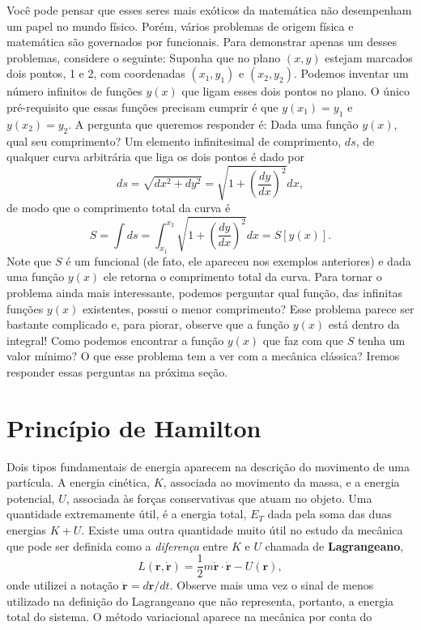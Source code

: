 \documentclass{article}
\begin{document}
Você pode pensar que esses seres mais exóticos da matemática não desempenham um papel no mundo físico. Porém, vários problemas de origem física e matemática são governados por funcionais. Para demonstrar apenas um desses problemas, considere o seguinte: Suponha que no plano $(x,y)$ estejam marcados dois pontos, 1 e 2, com coordenadas $(x_1,y_1)$ e $(x_2,y_2)$. Podemos inventar um número infinitos de funções $y(x)$ que ligam esses dois pontos no plano. O único pré-requisito que essas funções precisam cumprir é que $y(x_1) = y_1$ e $y(x_2)=y_2$. A pergunta que queremos responder é: Dada uma função $y(x)$, qual seu comprimento? Um elemento infinitesimal de comprimento, $ds$, de qualquer curva arbitrária que liga os dois pontos é dado por
\begin{equation}
    ds = \sqrt{dx^2+dy^2} = \sqrt{1+\left( \frac{dy}{dx} \right)^{2}}dx,
\end{equation}
de modo que o comprimento total da curva é 
\begin{equation}
    S = \int ds = \int_{x_1}^{x_2}\sqrt{1+\left( \frac{dy}{dx} \right)^{2}}dx = S[y(x)].
\end{equation}
Note que $S$ é um funcional (de fato, ele apareceu nos exemplos anteriores) e dada uma função $y(x)$ ele retorna o comprimento total da curva. Para tornar o problema ainda mais interessante, podemos perguntar qual função, das infinitas funções $y(x)$ existentes, possui o menor comprimento? Esse problema parece ser bastante complicado e, para piorar, observe que a função $y(x)$ está dentro da integral! Como podemos encontrar a função $y(x)$ que faz com que $S$ tenha um valor mínimo? O que esse problema tem a ver com a mecânica clássica? Iremos responder essas perguntas na próxima seção.

\section{Princípio de Hamilton}

Dois tipos fundamentais de energia aparecem na descrição do movimento de uma partícula. A energia cinética, $K$, associada ao movimento da massa, e a energia potencial, $U$, associada às forças conservativas que atuam no objeto. Uma quantidade extremamente útil, é a energia total, $E_T$ dada pela soma das duas energias $K+U$. Existe uma outra quantidade muito útil no estudo da mecânica que pode ser definida como a \textit{diferença} entre $K$ e $U$ chamada de \textbf{Lagrangeano},
\begin{equation}
    L(\mathbf{r},\dot{\mathbf{r}}) = \frac{1}{2}m\dot{\mathbf{r}}\cdot\dot{\mathbf{r}} - U(\mathbf{r}),
\end{equation}
onde utilizei a notação $\dot{\mathbf{r}} = d\mathbf{r}/dt$. Observe mais uma vez o sinal de menos utilizado na definição do Lagrangeano que não representa, portanto, a energia total do sistema. O método variacional aparece na mecânica por conta do 
\end{document}
